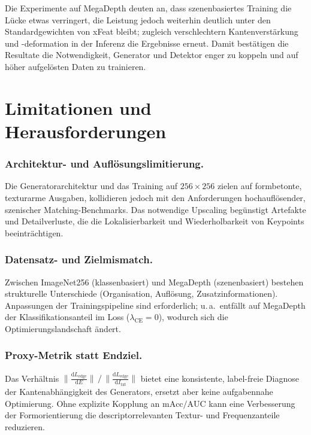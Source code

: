 Die Experimente auf MegaDepth deuten an, dass szenenbasiertes Training die Lücke etwas verringert, die Leistung jedoch weiterhin deutlich unter den Standardgewichten von \ac{xFeat} bleibt; zugleich verschlechtern Kantenverstärkung und -deformation in der Inferenz die Ergebnisse erneut. Damit bestätigen die Resultate die Notwendigkeit, Generator und Detektor enger zu koppeln und auf höher aufgelösten Daten zu trainieren. \,


\newpage

\section{Limitationen und Herausforderungen}
\label{sec:LimitationenHerausforderungen}

\subsubsection{Architektur- und Auflösungslimitierung.} Die Generatorarchitektur und das Training auf \(256{\times}256\) zielen auf formbetonte, texturarme Ausgaben, kollidieren jedoch mit den Anforderungen hochauflösender, szenischer Matching-Benchmarks. Das notwendige Upscaling begünstigt Artefakte und Detailverluste, die die Lokalisierbarkeit und Wiederholbarkeit von Keypoints beeinträchtigen.

\subsubsection{Datensatz- und Zielmismatch.} Zwischen ImageNet256 (klassenbasiert) und MegaDepth (szenenbasiert) bestehen strukturelle Unterschiede (Organisation, Auflösung, Zusatzinformationen). Anpassungen der Trainingspipeline sind erforderlich; u.\,a.\ entfällt auf MegaDepth der Klassifikationsanteil im Loss (\(\lambda_{\text{CE}}{=}0\)), wodurch sich die Optimierungslandschaft ändert. \,

\subsubsection{Proxy-Metrik statt Endziel.} Das Verhältnis \(\big\|\tfrac{\mathrm{d}L_{\text{edge}}}{\mathrm{d}E}\big\|\,/\,\big\|\tfrac{\mathrm{d}L_{\text{edge}}}{\mathrm{d}I_{\text{txt}}}\big\|\) bietet eine konsistente, label-freie Diagnose der Kantenabhängigkeit des Generators, ersetzt aber keine aufgabennahe Optimierung. Ohne explizite Kopplung an \(\text{mAcc}/\text{AUC}\) kann eine Verbesserung der Formorientierung die descriptorrelevanten Textur- und Frequenzanteile reduzieren. \,

